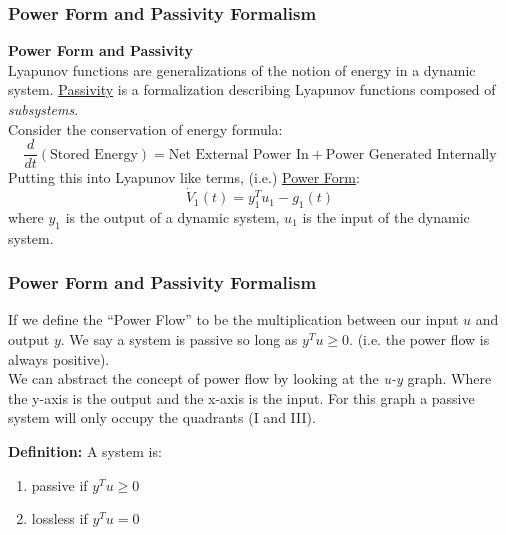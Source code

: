 \documentclass[11pt,handout]{beamer}   %
\begin{document}
\begin{frame}
\frametitle{Power Form and Passivity Formalism}
\textbf{Power Form and Passivity}\\
Lyapunov functions are generalizations of the notion of energy in a dynamic system. \underline{Passivity} is a formalization describing Lyapunov functions composed of \textit{subsystems}.\\
Consider the conservation of energy formula:
\begin{equation*}
\frac{d}{dt}(\text{Stored Energy}) = \text{Net External Power In} + \text{Power Generated Internally}
\end{equation*}
Putting this into Lyapunov like terms, (i.e.) \underline{Power Form}:
\begin{equation*}
\dot{V}_1(t) = y_1^T u_1 - g_1(t)
\end{equation*}
where $y_1$ is the output of a dynamic system, $u_1$ is the input of the dynamic system.\\
\end{frame}

\begin{frame}
\frametitle{Power Form and Passivity Formalism}
\small
If we define the ``Power Flow'' to be the multiplication between our input $u$ and output $y$. We say a system is passive so long as $y^Tu \geq 0 $. (i.e. the power flow is always positive). \\
\vspace{6pt}
We can abstract the concept of power flow by looking at the \textit{u-y} graph. Where the y-axis is the output and the x-axis is the input. For this graph a passive system will only occupy the quadrants (I and III).\\
\vspace{6pt}

\textbf{Definition:} A system is:
\begin{enumerate}
\item passive if $y^Tu \geq 0$
\item lossless if $y^Tu  = 0$
\end{enumerate}

\end{frame}


\end{document}
